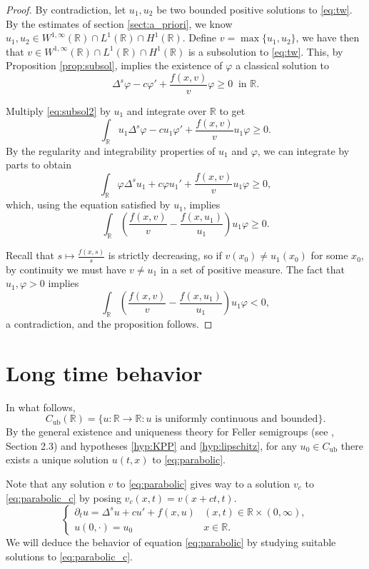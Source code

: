 \documentclass[11pt,a4paper]{amsart}
\newcommand{\R}{\mathbb{R}}
\newcommand{\Cub}{C_{\mathrm{ub}}}
\renewcommand{\phi}{\varphi}
\begin{document}
\begin{proof}
By contradiction, let $u_1, u_2$ be two bounded positive solutions to \eqref{eq:tw}. By the estimates of section \ref{sect:a_priori}, we know $u_1,u_2 \in W^{1,\infty}(\R)\cap L^{1}(\R) \cap H^1(\R)$. Define $v = \max\{u_1,u_2\}$, we have then that $ v \in W^{1,\infty}(\R)\cap L^{1}(\R) \cap H^1(\R)$ is a subsolution to \eqref{eq:tw}. This, by Proposition \ref{prop:subsol}, implies the existence of $\phi$ a classical solution to
\begin{equation}
\label{eq:subsol2}
\Delta^s \phi - c \phi' + \frac{f(x,v)}{v} \phi \geq 0~ \text{ in }\R.
\end{equation}

Multiply \eqref{eq:subsol2} by $u_1$ and integrate over $\R$ to get
\[\int_{\R} u_1 \Delta^s \phi - cu_1\phi' + \frac{f(x,v)}{v} u_1 \phi \geq 0.\]
By the regularity and integrability properties of $u_1$ and $\phi$, we can integrate by parts to obtain
\[\int_{\R} \phi \Delta^su_1  + c\phi u_1' + \frac{f(x,v)}{v} u_1 \phi \geq 0,\]
which, using the equation satisfied by $u_1$, implies
\[\int_{\R} \left(\frac{f(x,v)}{v} - \frac{f(x,u_1)}{u_1}\right)u_1 \phi \geq 0.\]

Recall that $s \mapsto \frac{f(x,s)}{s}$ is strictly decreasing, so if $v(x_0)\neq u_1(x_0)$ for some $x_0$, by continuity we must have $v\neq u_1$ in a set of positive measure. The fact that $u_1, \phi >0$ implies
\[\int_{\R} \left(\frac{f(x,v)}{v} - \frac{f(x,u_1)}{u_1}\right)u_1 \phi < 0,\]
a contradiction, and the proposition follows.
\end{proof}

\section{Long time behavior}
\label{sect:parabolic}
In what follows, 
\[\Cub(\R) = \{u:\R \rightarrow \R: u \text{ is uniformly continuous and bounded}\}.\]
By the general existence and uniqueness theory for Feller semigroups (see \cite{CR13}, Section 2.3) and hypotheses \eqref{hyp:KPP} and \eqref{hyp:lipschitz}, for any $u_0 \in \Cub$ there exists a unique solution $u(t,x)$ to \eqref{eq:parabolic}.

Note that any solution $v$ to \eqref{eq:parabolic} gives way to a solution $v_c$ to \eqref{eq:parabolic_c} by posing $v_c(x,t) = v(x + ct, t)$.
\begin{equation}
\label{eq:parabolic_c}
\begin{cases}
\partial_t u = \Delta^s u + cu' + f(x,u) & (x,t) \in \R\times (0,\infty), \\
u(0,\cdot) = u_0 & x\in \R.
\end{cases}
\end{equation}
We will deduce the behavior of equation \eqref{eq:parabolic} by studying suitable solutions to \eqref{eq:parabolic_c}. 
\end{document}
